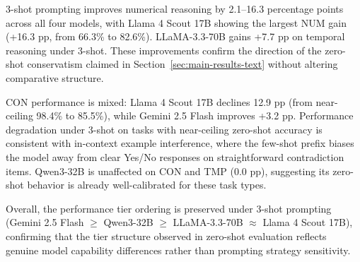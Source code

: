 \documentclass[11pt]{article}
\begin{document}
3-shot prompting improves numerical reasoning by 2.1--16.3 percentage points across all four models, with Llama 4 Scout 17B showing the largest NUM gain (+16.3 pp, from 66.3\% to 82.6\%). LLaMA-3.3-70B gains +7.7 pp on temporal reasoning under 3-shot. These improvements confirm the direction of the zero-shot conservatism claimed in Section~\ref{sec:main-results-text} without altering comparative structure.

CON performance is mixed: Llama 4 Scout 17B declines 12.9 pp (from near-ceiling 98.4\% to 85.5\%), while Gemini 2.5 Flash improves +3.2 pp. Performance degradation under 3-shot on tasks with near-ceiling zero-shot accuracy is consistent with in-context example interference, where the few-shot prefix biases the model away from clear Yes/No responses on straightforward contradiction items. Qwen3-32B is unaffected on CON and TMP (0.0 pp), suggesting its zero-shot behavior is already well-calibrated for these task types.

Overall, the performance tier ordering is preserved under 3-shot prompting (Gemini 2.5 Flash $\geq$ Qwen3-32B $\geq$ LLaMA-3.3-70B $\approx$ Llama 4 Scout 17B), confirming that the tier structure observed in zero-shot evaluation reflects genuine model capability differences rather than prompting strategy sensitivity.
\end{document}
